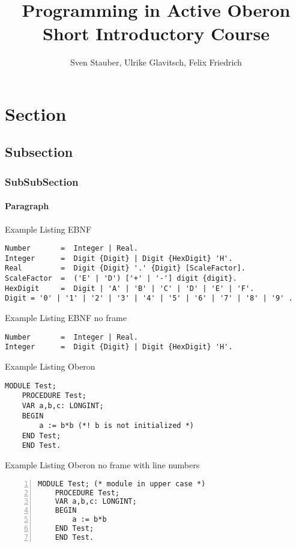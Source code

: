 \documentclass[a4wide,11pt]{article}
\begin{document}
\title{Programming in Active Oberon \\[1em] \normalsize Short Introductory Course}
\author{Sven Stauber, Ulrike Glavitsch, Felix Friedrich}
\maketitle

\tableofcontents

\section{Section}
\subsection{Subsection}
\subsubsection{SubSubSection}
\paragraph{Paragraph}

Example Listing EBNF
\begin{lstlisting}[language=ebnf]
Number       =  Integer | Real.
Integer      =  Digit {Digit} | Digit {HexDigit} 'H'.
Real         =  Digit {Digit} '.' {Digit} [ScaleFactor].
ScaleFactor  =  ('E' | 'D') ['+' | '-'] digit {digit}.
HexDigit     =  Digit | 'A' | 'B' | 'C' | 'D' | 'E' | 'F'.
Digit = '0' | '1' | '2' | '3' | '4' | '5' | '6' | '7' | '8' | '9' .
\end{lstlisting}

Example Listing EBNF no frame
\begin{lstlisting}[language=ebnf,frame=none]
Number       =  Integer | Real.
Integer      =  Digit {Digit} | Digit {HexDigit} 'H'.
\end{lstlisting}


Example Listing Oberon
\begin{lstlisting}[language=Oberon]
    MODULE Test;
    PROCEDURE Test;
    VAR a,b,c: LONGINT;
    BEGIN
        a := b*b (*! b is not initialized *) 
    END Test;
    END Test.
\end{lstlisting}

Example Listing Oberon no frame with line numbers
\begin{lstlisting}[language=Oberon,frame=none,numbers=left]
    MODULE Test; (* module in upper case *)
    PROCEDURE Test;
    VAR a,b,c: LONGINT;
    BEGIN
        a := b*b
    END Test;
    END Test.
\end{lstlisting}
\end{document}
